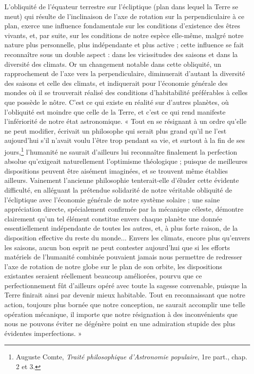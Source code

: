 \documentclass[a4paper, 11pt, oneside, landscape]{article}
\begin{document}
L'obliquité de l'équateur terrestre sur l'écliptique (plan dans lequel la Terre se meut) qui résulte de l'inclinaison de l'axe de rotation sur la perpendiculaire à ce plan, exerce une influence fondamentale sur les conditions d'existence des êtres vivants, et, par suite, sur les conditions de notre espèce elle-même, malgré notre nature plus personnelle, plus indépendante et plus active ; cette influence se fait reconnaître sous un double aspect : dans les vicissitudes des saisons et dans la diversité des climats. Or un changement notable dans cette obliquité, un rapprochement de l'axe vers la perpendiculaire, diminuerait d'autant la diversité des saisons et celle des climats, et indiquerait pour l'économie générale des mondes où il se trouverait réalisé des conditions d'habitabilité préférables à celles que possède le nôtre. C'est ce qui existe en réalité sur d'autres planètes, où l'obliquité est moindre que celle de la Terre, et c'est ce qui rend manifeste l'infériorité de notre état astronomique. « Tout en se résignant à un ordre qu'elle ne peut modifier, écrivait un philosophe qui serait plus grand qu'il ne l'est aujourd'hui s'il n'avait voulu l'être trop pendant sa vie, et surtout à la fin de ses jours,\footnote{Auguste Comte, \emph{Traité philosophique d'Astronomie populaire}, 1re part., chap. 2 et 3.} l'humanité ne saurait d'ailleurs lui reconnaître finalement la perfection absolue qu'exigeait naturellement l'optimisme théologique ; puisque de meilleures dispositions peuvent être aisément imaginées, et se trouvent même établies ailleurs. Vainement l'ancienne philosophie tenterait-elle d'éluder cette évidente difficulté, en alléguant la prétendue solidarité de notre véritable obliquité de l'écliptique avec l'économie générale de notre système solaire ; une saine appréciation directe, spécialement confirmée par la mécanique céleste, démontre clairement qu'un tel élément constitue envers chaque planète une donnée essentiellement indépendante de toutes les autres, et, à plus forte raison, de la disposition effective du reste du monde... Envers les climats, encore plus qu'envers les saisons, aucun bon esprit ne peut contester aujourd'hui que si les efforts matériels de l'humanité combinée pouvaient jamais nous permettre de redresser l'axe de rotation de notre globe sur le plan de son orbite, les dispositions existantes seraient réellement beaucoup améliorées, pourvu que ce perfectionnement fût d'ailleurs opéré avec toute la sagesse convenable, puisque la Terre finirait ainsi par devenir mieux habitable. Tout en reconnaissant que notre action, toujours plus bornée que notre conception, ne saurait accomplir une telle opération mécanique, il importe que notre résignation à des inconvénients que nous ne pouvons éviter ne dégénère point en une admiration stupide des plus évidentes imperfections. »
\end{document}
